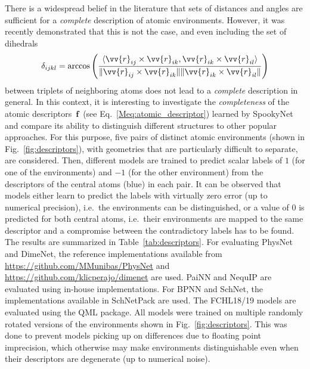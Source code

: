 \documentclass[%
superscriptaddress,
reprint,
nofootinbib,
amsmath,amssymb,amsfonts,
floatfix,
altaffilletter,
showkeys,
]{revtex4-2}
\newcommand{\nn}{SpookyNet}
\begin{document}
There is a widespread belief in the literature that sets of distances and angles are sufficient for a \emph{complete} description of atomic environments.\cite{von2015fourier,kocer2020continuous} However, it was recently demonstrated that this is not the case, and even including the set of dihedrals
\begin{equation}
\delta_{ijkl} = \mathrm{arccos}\left(\frac{\langle \vv{r}_{ij}\times\vv{r}_{ik}, \vv{r}_{ik}\times\vv{r}_{il} \rangle}{\lVert\vv{r}_{ij}\times\vv{r}_{ik}\rVert \lVert \vv{r}_{ik}\times\vv{r}_{il}\rVert}\right)
\label{eq:dihedrals}
\end{equation}
between triplets of neighboring atoms does not lead to a \textit{complete} description in general.\cite{pozdnyakov2020incompleteness} In this context, it is interesting to investigate the \emph{completeness} of the atomic descriptors~$\mathbf{f}$~(see Eq.~\ref{Meq:atomic_descriptor})  learned by \nn{} and compare its ability to distinguish different structures to other popular approaches. For this purpose, five pairs of distinct atomic environments (shown in Fig.~\ref{fig:descriptors}), with geometries that are particularly difficult to separate, are considered. Then, different models are trained to predict scalar labels of $1$ (for one of the environments) and $-1$ (for the other environment) from the descriptors of the central atoms (blue) in each pair. It can be observed that models either learn to predict the labels with virtually zero error (up to numerical precision), i.e.\ the environments can be distinguished, or a value of $0$ is predicted for both central atoms, i.e.\ their environments are mapped to the same descriptor and a compromise between the contradictory labels has to be found. The results are summarized in Table~\ref{tab:descriptors}. For evaluating PhysNet\cite{unke2019physnet} and DimeNet,\cite{klicpera2020directional} the reference implementations available from \url{https://github.com/MMunibas/PhysNet} and  \url{https://github.com/klicperajo/dimenet} are used. PaiNN\cite{schutt2021equivariant} and NequIP\cite{batzner2021se} are evaluated using in-house implementations. For BPNN and SchNet, the implementations available in SchNetPack\cite{schutt2018schnetpack} are used. The FCHL18/19\cite{faber2018alchemical,christensen2020fchl} models are evaluated using the QML package.\cite{qmlpackage} All models were trained on multiple randomly rotated versions of the environments shown in Fig.~\ref{fig:descriptors}. This was done to prevent models picking up on differences due to floating point imprecision, which otherwise may make environments distinguishable even when their descriptors are degenerate (up to numerical noise).
\end{document}
